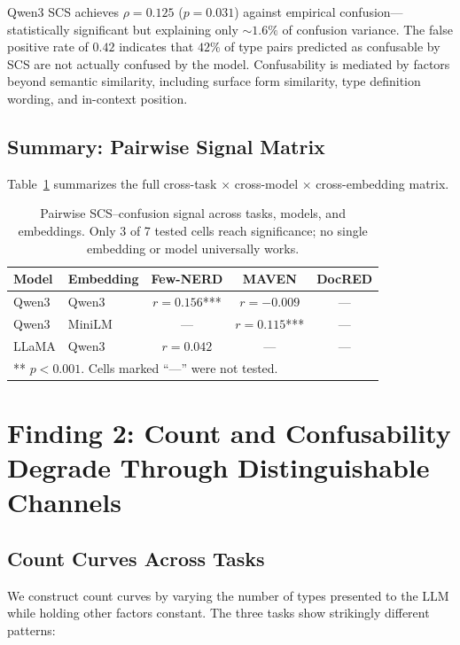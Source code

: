\documentclass[11pt,a4paper]{article}
\begin{document}
Qwen3 SCS achieves $\rho{=}0.125$ ($p{=}0.031$) against empirical confusion---statistically significant but explaining only ${\sim}1.6\%$ of confusion variance.
The false positive rate of $0.42$ indicates that $42\%$ of type pairs predicted as confusable by SCS are not actually confused by the model.
Confusability is mediated by factors beyond semantic similarity, including surface form similarity, type definition wording, and in-context position.

\subsection{Summary: Pairwise Signal Matrix}

Table~\ref{tab:pairwise_matrix} summarizes the full cross-task $\times$ cross-model $\times$ cross-embedding matrix.

\begin{table}[t]
\centering
\caption{Pairwise SCS--confusion signal across tasks, models, and embeddings. Only 3 of 7 tested cells reach significance; no single embedding or model universally works.}
\label{tab:pairwise_matrix}
\small
\begin{tabular}{llccc}
\toprule
\textbf{Model} & \textbf{Embedding} & \textbf{Few-NERD} & \textbf{MAVEN} & \textbf{DocRED} \\
\midrule
Qwen3 & Qwen3 & $r{=}0.156$*** & $r{=}{-}0.009$ & --- \\
Qwen3 & MiniLM & --- & $r{=}0.115$*** & --- \\
LLaMA & Qwen3 & $r{=}0.042$ & --- & --- \\
\bottomrule
\multicolumn{5}{l}{\scriptsize *** $p<0.001$. Cells marked ``---'' were not tested.}
\end{tabular}
\end{table}


\section{Finding 2: Count and Confusability Degrade Through Distinguishable Channels}
\label{sec:finding2}

\subsection{Count Curves Across Tasks}
\label{sec:count_curves}

We construct count curves by varying the number of types presented to the LLM while holding other factors constant.
The three tasks show strikingly different patterns:
\end{document}
